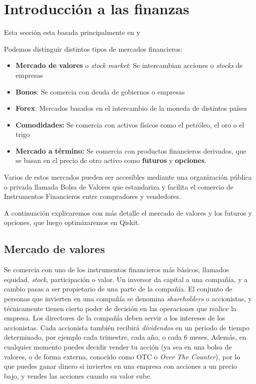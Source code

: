 \section{Introducción a las finanzas}
\label{sec:introfinance}

Esta sección esta basada principalmente en \cite{wilmott_howison_dewynne_1995} y \cite{10.5555/1370958}

Podemos distinguir distintos tipos de mercados financieros:
\begin{itemize}
    \item \textbf{Mercado de valores} o \textit{stock market}: Se intercambian acciones o \textit{stocks} de empresas
    \item \textbf{Bonos}: Se comercia con deuda de gobiernos o empresas
    \item \textbf{Forex}: Mercados basados en el intercambio de la moneda de distintos países
    \item \textbf{Comodidades:} Se comercia con activos físicos como el petróleo, el oro o el trigo
    \item \textbf{Mercado a término:} Se comercia con productos financieros derivados, que se basan en el precio de otro activo como \textbf{futuros} y \textbf{opciones}.
\end{itemize}

Varios de estos mercados pueden ser accesibles mediante una organización pública o privada llamada Bolsa de Valores que estandariza y facilita el comercio de Instrumentos Financieros entre compradores y vendedores.

A continuación explicaremos con más detalle el mercado de valores y los futuros y opciones, que luego optimizaremos en Qiskit.

\subsection{Mercado de valores}
Se comercia con uno de los instrumentos financieros más básicos, llamados equidad, \textit{stock}, participación o valor. Un inversor da capital a una compañía, y a cambio pasas a ser propietario de una parte de la compañía. El conjunto de personas que invierten en una compañía se denomina \textit{shareholders} o accionistas, y técnicamente tienen cierto poder de decisión en las operaciones que realice la empresa. Los directores de la compañía deben servir a los intereses de los accionistas. Cada accionista también recibirá \textit{dividendos} en un periodo de tiempo determinado, por ejemplo cada trimestre, cada año, o cada 6 meses. Además, en cualquier momento puedes decidir vender tu acción (ya sea en una bolsa de valores, o de forma externa, conocido como OTC o \textit{Over The Counter}), por lo que puedes ganar dinero si inviertes en una empresa con acciones a un precio bajo, y vendes las acciones cuando su valor sube.

